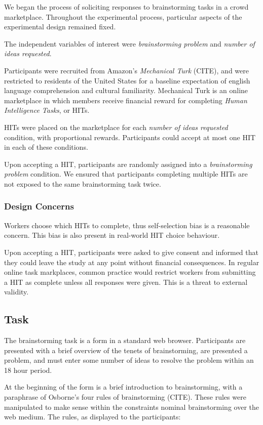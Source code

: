 We began the process of soliciting responses to brainstorming tasks in a crowd marketplace. Throughout the experimental process, particular aspects of the experimental design remained fixed.

The independent variables of interest were \emph{brainstorming problem} and \emph{number of ideas requested}.

Participants were recruited from Amazon's \emph{Mechanical Turk} (CITE), and were restricted to residents of the United States for a baseline expectation of english language comprehension and cultural familiarity. Mechanical Turk is an online marketplace in which members receive financial reward for completing \emph{Human Intelligence Tasks}, or HITs.

HITs were placed on the marketplace for each \emph{number of ideas requested} condition, with proportional rewards. Participants could accept at most one HIT in each of these conditions.

Upon accepting a HIT, participants are randomly assigned into a \emph{brainstorming problem} condition. We ensured that participants completing multiple HITs are not exposed to the same brainstorming task twice.

\subsubsection{Design Concerns}
Workers choose which HITs to complete, thus self-selection bias is a reasonable concern. This bias is also present in real-world HIT choice behaviour. 

Upon accepting a HIT, participants were asked to give consent and informed that they could leave the study at any point without financial consequences. In regular online task markplaces, common practice would restrict workers from submitting a HIT as complete unless all responses were given. This is a threat to external validity.

\subsection{Task}

The brainstorming task is a form in a standard web browser. Participants are presented with a brief overview of the tenets of brainstorming, are presented a problem, and must enter some number of ideas to resolve the problem within an 18 hour period.

At the beginning of the form is a brief introduction to brainstorming, with a paraphrase of Osborne's four rules of brainstorming (CITE). These rules were manipulated to make sense within the constraints nominal brainstorming over the web medium. The rules, as displayed to the participants:

